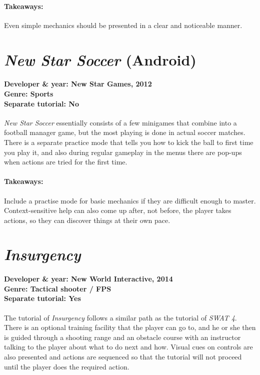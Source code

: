 \paragraph{Takeaways:}
Even simple mechanics should be presented in a clear and noticeable manner.

\section{\textit{New Star Soccer } (Android)}
\paragraph{Developer \& year: New Star Games, 2012 \\ Genre: Sports \\ Separate tutorial: No \\}
\textit{New Star Soccer} essentially consists of a few minigames that combine into a football manager game, but the most playing is done in actual soccer matches. There is a separate practice mode that tells you how to kick the ball to first time you play it, and also during regular gameplay in the menus there are pop-ups when actions are tried for the first time.
\paragraph{Takeaways:}
Include a practise mode for basic mechanics if they are difficult enough to master.
Context-sensitive help can also come up after, not before, the player takes actions, so they can discover things at their own pace.

\section{\textit{Insurgency}}
\paragraph{Developer \& year: New World Interactive, 2014 \\ Genre: Tactical shooter / FPS \\ Separate tutorial: Yes \\}
The tutorial of \textit{Insurgency} follows a similar path as the tutorial of \textit{SWAT 4}. There is an optional training facility that the player can go to, and he or she then is guided through a shooting range and an obstacle course with an instructor talking to the player about what to do next and how. Visual cues on controls are also presented and actions are sequenced so that the tutorial will not proceed until the player does the required action. 
